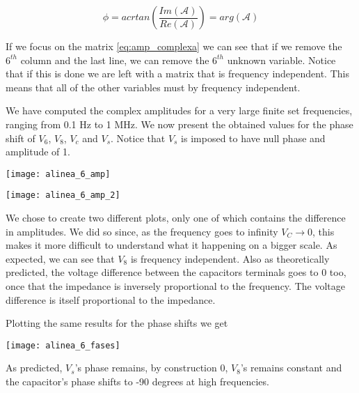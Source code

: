 \begin{center}
    \begin{equation}
        \phi=acrtan\left(\frac{Im(\mathcal{A})}{Re(\mathcal{A})}\right)=arg(\mathcal{A})
    \end{equation}
\end{center}

If we focus on the matrix \ref{eq:amp_complexa} we can see that if we remove the $6^{th}$ column and the last line, we can remove the $6^{th}$ unknown variable. Notice that if this is done we are left with a matrix that is frequency independent. This means that all of the other variables must by frequency independent.

We have computed the complex amplitudes for a very large finite set frequencies, ranging from 0.1 Hz to 1 MHz. We now present the obtained values for the phase shift of $V_6$, $V_8$, $V_c$ and $V_s$. Notice that $V_s$ is imposed to have null phase and amplitude of 1.

\begin{center}
    \texttt{[image: alinea\_6\_amp]}
     \label{fig:amp(f)1}
\end{center}

\begin{center}
    \texttt{[image: alinea\_6\_amp\_2]}
     \label{fig:amp(f)2}
\end{center}

We chose to create two different plots, only one of which contains the difference in amplitudes. We did so since, as the frequency goes to infinity $V_C\longrightarrow0$, this makes it more difficult to understand what it happening on a bigger scale.
As expected, we can see that $V_8$ is frequency independent. Also as theoretically predicted, the voltage difference between the capacitors terminals goes to 0 too, once that the impedance is inversely proportional to the frequency. The voltage difference is itself proportional to the impedance.

Plotting the same results for the phase shifts we get
\begin{center}
    \texttt{[image: alinea\_6\_fases]}
     \label{fig:amp(f)1}
\end{center}

As predicted, $V_s$'s phase remains, by construction 0, $V_8$'s remains constant and the capacitor's phase shifts to -90 degrees at high frequencies.
